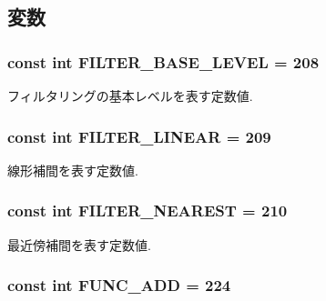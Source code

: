 \subsection{変数}
\hypertarget{classm3g_1_1Texture2D_d1924d32385b5353ad11ecd8b1ec0ad5}{
\subsubsection[{FILTER\_\-BASE\_\-LEVEL}]{\setlength{\rightskip}{0pt plus 5cm}const int {\bf FILTER\_\-BASE\_\-LEVEL} = 208}}
\label{classm3g_1_1Texture2D_d1924d32385b5353ad11ecd8b1ec0ad5}


フィルタリングの基本レベルを表す定数値. \hypertarget{classm3g_1_1Texture2D_5f06003f50141919a3665d22f55602a8}{
\subsubsection[{FILTER\_\-LINEAR}]{\setlength{\rightskip}{0pt plus 5cm}const int {\bf FILTER\_\-LINEAR} = 209}}
\label{classm3g_1_1Texture2D_5f06003f50141919a3665d22f55602a8}


線形補間を表す定数値. \hypertarget{classm3g_1_1Texture2D_1ee2e06d6462fdafd5f17e63eddfb8fe}{
\subsubsection[{FILTER\_\-NEAREST}]{\setlength{\rightskip}{0pt plus 5cm}const int {\bf FILTER\_\-NEAREST} = 210}}
\label{classm3g_1_1Texture2D_1ee2e06d6462fdafd5f17e63eddfb8fe}


最近傍補間を表す定数値. \hypertarget{classm3g_1_1Texture2D_825ea3aff59f79958257ac557c802760}{
\subsubsection[{FUNC\_\-ADD}]{\setlength{\rightskip}{0pt plus 5cm}const int {\bf FUNC\_\-ADD} = 224}}
\label{classm3g_1_1Texture2D_825ea3aff59f79958257ac557c802760}


